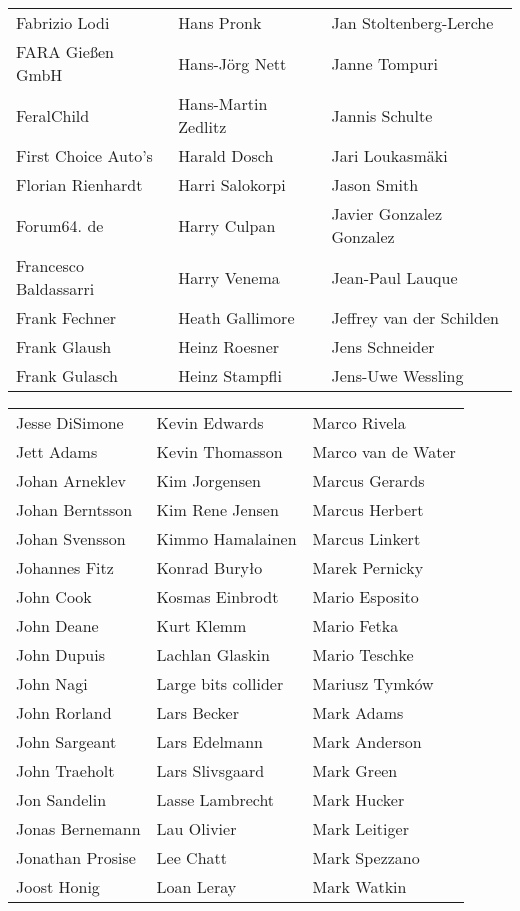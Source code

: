 \begin{small}
\begin{tabular}{p{4cm}p{4cm}p{4cm}}
Fabrizio Lodi & Hans Pronk & Jan Stoltenberg-Lerche \\
FARA Gießen GmbH & Hans-Jörg Nett & Janne Tompuri \\
FeralChild & Hans-Martin Zedlitz & Jannis Schulte \\
First Choice Auto's & Harald Dosch & Jari Loukasmäki \\
Florian Rienhardt & Harri Salokorpi & Jason Smith \\
Forum64. de & Harry Culpan & Javier Gonzalez Gonzalez \\
Francesco Baldassarri & Harry Venema & Jean-Paul Lauque \\
Frank Fechner & Heath Gallimore & Jeffrey van der Schilden \\
Frank Glaush & Heinz Roesner & Jens Schneider \\
Frank Gulasch & Heinz Stampfli & Jens-Uwe Wessling \\
\end{tabular}
\newpage
\setlength{\tabcolsep}{1mm}
\begin{tabular}{p{4cm}p{4cm}p{4cm}}
Jesse DiSimone & Kevin Edwards & Marco Rivela \\
Jett Adams & Kevin Thomasson & Marco van de Water \\
Johan Arneklev & Kim Jorgensen & Marcus Gerards \\
Johan Berntsson & Kim Rene Jensen & Marcus Herbert \\
Johan Svensson & Kimmo Hamalainen & Marcus Linkert \\
Johannes Fitz & Konrad Buryło & Marek Pernicky \\
John Cook & Kosmas Einbrodt & Mario Esposito \\
John Deane & Kurt Klemm & Mario Fetka \\
John Dupuis & Lachlan Glaskin & Mario Teschke \\
John Nagi & Large bits collider & Mariusz Tymków \\
John Rorland & Lars Becker & Mark Adams \\
John Sargeant & Lars Edelmann & Mark Anderson \\
John Traeholt & Lars Slivsgaard & Mark Green \\
Jon Sandelin & Lasse Lambrecht & Mark Hucker \\
Jonas Bernemann & Lau Olivier & Mark Leitiger \\
Jonathan Prosise & Lee Chatt & Mark Spezzano \\
Joost Honig & Loan Leray & Mark Watkin \\

\end{tabular}
\end{small}
